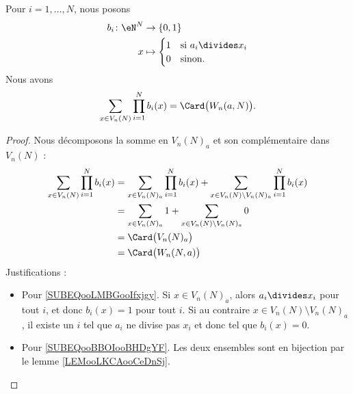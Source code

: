 \begin{lemma}       \label{LEMooOPXHooHzoHrm}
    Pour \( i=1,\ldots, N\), nous posons
    \begin{equation}
        \begin{aligned}
            b_i\colon \eN^N&\to \{ 0,1 \} \\
            x&\mapsto \begin{cases}
                1    &   \text{si } a_i\divides x_i\\
                0    &    \text{sinon. }
            \end{cases}
        \end{aligned}
    \end{equation}
    Nous avons
    \begin{equation}
        \sum_{x\in V_n(N)}\prod_{i=1}^Nb_i(x)=\Card\big( W_n(a,N) \big).
    \end{equation}
\end{lemma}

\begin{proof}
    Nous décomposons la somme en \( V_n(N)_a\) et son complémentaire dans \( V_n(N)\) :
    \begin{subequations}
        \begin{align}
        \sum_{x\in V_n(N)}\prod_{i=1}^Nb_i(x)&=\sum_{x\in V_n(N)_a}\prod_{i=1}^Nb_i(x)+\sum_{x\in V_n(N)\setminus V_n(N)_a}\prod_{i=1}^Nb_i(x)\\
        &=\sum_{x\in V_n(N)_a}1+\sum_{x\in V_n(N)\setminus V_n(N)_a}0       \label{SUBEQooLMBGooIfxjgy}\\
        &=\Card\big( V_n(N)_a \big) \\
        &=\Card\big( W_n(N,a) \big)     \label{SUBEQooBBOIooBHDgYF}
        \end{align}
    \end{subequations}
    Justifications :
    \begin{itemize}
        \item Pour \eqref{SUBEQooLMBGooIfxjgy}.
    Si \( x\in V_n(N)_a\), alors \( a_i\divides x_i\) pour tout \( i\), et donc \( b_i(x)=1\) pour tout \( i\). Si au contraire \( x\in V_n(N)\setminus V_n(N)_a\), il existe un \( i\) tel que \( a_i\) ne divise pas \( x_i\) et donc tel que \( b_i(x)=0\).
\item Pour \eqref{SUBEQooBBOIooBHDgYF}. Les deux ensembles sont en bijection par le lemme \ref{LEMooLKCAooCeDnSj}.
    \end{itemize}
\end{proof}

